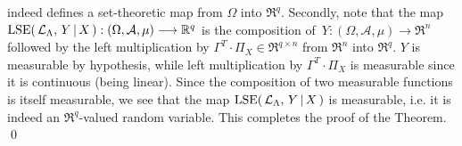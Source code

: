 indeed defines a set-theoretic map from $\Omega$ into $\Re^{q}$.
Secondly, note that the map
$\textnormal{LSE}\!\left(\,\mathcal{L}_{\Lambda},\,Y\,\vert\,X\,\right) : (\Omega,\mathcal{A},\mu) \longrightarrow \mathbb{R}^{q}$
is the composition of \,$Y : (\Omega,\mathcal{A},\mu) \rightarrow \Re^{n}$ followed by the
left multiplication by $\Gamma^{T} \cdot \Pi_{X} \in \Re^{q \times n}$ from $\Re^{n}$ into $\Re^{q}$.
$Y$ is measurable by hypothesis, while left multiplication by $\Gamma^{T} \cdot \Pi_{X}$ is measurable
since it is continuous (being linear).
Since the composition of two measurable functions is itself measurable,
we see that the map $\textnormal{LSE}\!\left(\,\mathcal{L}_{\Lambda},\,Y\,\vert\,X\,\right)$ is measurable,
i.e. it is indeed an $\Re^{q}$-valued random variable.
This completes the proof of the Theorem.
\qed

